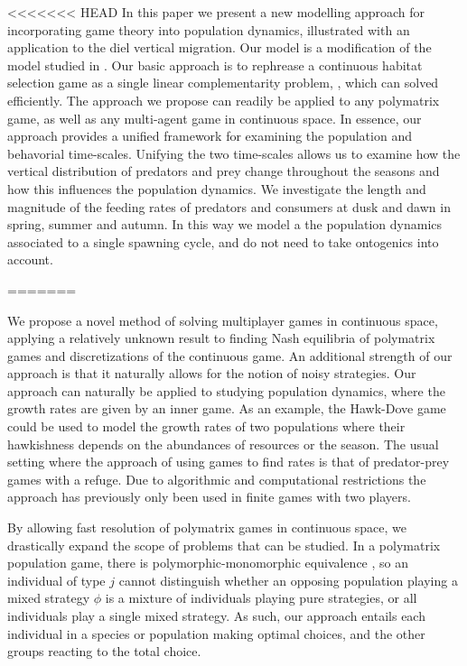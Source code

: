<<<<<<< HEAD
In this paper we present a new modelling  approach for incorporating game theory into population dynamics, illustrated with an application to the diel vertical migration. Our model is a modification of the model studied in \citep{verticalmigration}. Our basic approach is to rephrease a continuous habitat selection game as a single linear complementarity problem, \citep{miller1991copositive}, which can solved efficiently. The approach we propose can readily be applied to any polymatrix game, as well as any multi-agent game in continuous space. In essence, our approach provides a unified framework for examining the population and behavorial time-scales.  Unifying  the two time-scales allows us to examine how the vertical distribution of predators and prey change throughout the seasons and how this influences the population dynamics. We investigate the length and magnitude of the feeding rates of predators and consumers at dusk and dawn in spring, summer and autumn. In this way we model a the population dynamics associated to a single spawning cycle, and do not need to take ontogenics into account. 

=======

We propose a novel method of solving multiplayer games in continuous space, applying a relatively unknown result to finding Nash equilibria of polymatrix games and discretizations of the continuous game. An additional strength of our approach is that it naturally allows for the notion of noisy strategies. Our approach can naturally be applied to studying population dynamics, where the growth rates are given by an inner game. As an example, the Hawk-Dove game could be used to model the growth rates of two populations where their hawkishness depends on the abundances of resources or the season. The usual setting where the approach of using games to find rates is that of predator-prey games with a refuge. Due to algorithmic and computational restrictions the approach has previously only been used in finite games with two players.

By allowing fast resolution of polymatrix games in continuous space, we drastically expand the scope of problems that can be studied. In a polymatrix population game, there is polymorphic-monomorphic equivalence \citep{cressmannbook}, so an individual of type $j$ cannot distinguish whether an opposing population playing a mixed strategy $\phi$ is a mixture of individuals playing pure strategies, or all individuals play a single mixed strategy. As such, our approach entails each individual in a species or population making optimal choices, and the other groups reacting to the total choice.

